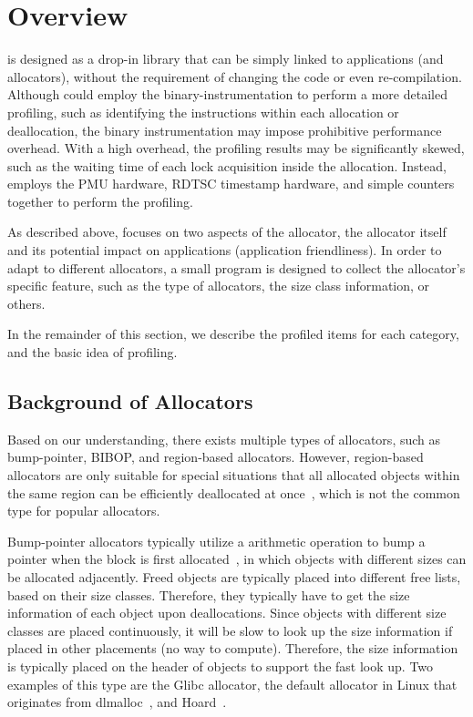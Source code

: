 \section{Overview}

\MP{} is designed as a drop-in library that can be simply linked to applications (and allocators), without the requirement of changing the code or even re-compilation. Although \MP{} could employ the binary-instrumentation to perform a more detailed profiling, such as identifying the instructions within each allocation or deallocation, the binary instrumentation may impose prohibitive performance overhead. With a high overhead, the profiling results may be significantly skewed, such as the waiting time of each lock acquisition inside the allocation. Instead, \MP{} employs the PMU hardware, RDTSC timestamp hardware, and simple counters together to perform the profiling.  
 
As described above, \MP{} focuses on two aspects of the allocator, the allocator itself and its potential impact on applications (application friendliness). In order to adapt to different allocators, a small program is designed to collect the allocator's specific feature, such as the type of allocators, the size class information, or others. 

In the remainder of this section, we describe the profiled items for each category, and the basic idea of profiling. 

\subsection{Background of Allocators}

\label{sec:allocator}

Based on our understanding, there exists multiple types of allocators, such as bump-pointer, BIBOP, and region-based allocators. However, region-based allocators are only suitable for special situations that all allocated objects within the same region can be efficiently deallocated at once~\cite{Gay:1998:MME:277650.277748}, which is not the common type for popular allocators. 

Bump-pointer allocators typically utilize a  arithmetic operation to bump a pointer when the block is first allocated~\cite{Cling}, in which objects with different sizes can be allocated adjacently. Freed objects are typically placed into different free lists, based on their size classes.  Therefore, they typically have to get the size information of each object upon deallocations. Since objects with different size classes are placed continuously, it will be slow to look up the size information if placed in other placements (no way to compute). Therefore, the size information is typically placed on the header of objects to support the fast look up.  Two examples of this type are the Glibc allocator, the default allocator in Linux that originates from dlmalloc~\cite{}, and Hoard~\cite{Hoard}.  

